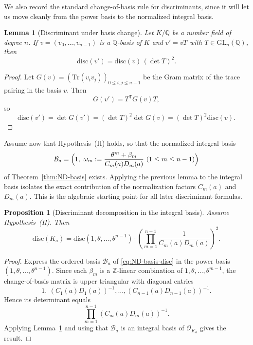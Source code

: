 \documentclass[11pt,letterpaper]{amsart}
\newcommand{\Q}{\mathbb{Q}}
\newcommand{\Z}{\mathbb{Z}}
\newcommand{\cO}{\mathcal{O}}
\newcommand{\GL}{\mathrm{GL}}
\newcommand{\Tr}{\mathrm{Tr}}
\newcommand{\disc}{\mathrm{disc}}
\theoremstyle{plain}
\newtheorem{proposition}[theorem]{Proposition}
\newtheorem{lemma}[theorem]{Lemma}
\theoremstyle{definition}
\begin{document}
We also record the standard change-of-basis rule for discriminants, since it will let us move cleanly from the power basis to the normalized integral basis.


\begin{lemma}[Discriminant under basis change]\label{lem:disc-basis-change}
Let $K/\Q$ be a number field of degree $n$.
If $v=(v_0,\dots,v_{n-1})$ is a $\Q$-basis of $K$ and $v'=vT$ with $T\in \GL_n(\Q)$, then
\[
\disc(v')=\disc(v)\,(\det T)^2.
\]
\end{lemma}

\begin{proof}
Let $G(v)=(\Tr(v_iv_j))_{0\le i,j\le n-1}$ be the Gram matrix of the trace pairing in the basis $v$.
Then
\[
G(v')=T^{\mathsf T}G(v)T,
\]
so
\[
\disc(v')=\det G(v')=(\det T)^2\det G(v)=(\det T)^2\disc(v).
\]
\end{proof}

Assume now that Hypothesis~\textup{(H)} holds, so that the normalized integral basis
\begin{equation}\label{eq:ND-basis-disc}
\mathcal B_a=
\Bigl(1,\ \omega_m:=\frac{\theta^m+\beta_m}{C_m(a)D_m(a)}\ (1\le m\le n-1)\Bigr)
\end{equation}
of Theorem~\ref{thm:ND-basis} exists. Applying the previous lemma to the integral basis isolates the exact contribution of the normalization factors \(C_m(a)\) and \(D_m(a)\). This is the algebraic starting point for all later discriminant formulas.

\begin{proposition}[Discriminant decomposition in the integral basis]
\label{prop:disc-ND-basis}
Assume Hypothesis~\textup{(H)}.
Then
\[
\disc(K_a)=\disc(1,\theta,\dots,\theta^{n-1})
\cdot
\left(\prod_{m=1}^{n-1}\frac{1}{C_m(a)D_m(a)}\right)^2.
\]
\end{proposition}

\begin{proof}
Express the ordered basis $\mathcal B_a$ of \eqref{eq:ND-basis-disc} in the power basis
$(1,\theta,\dots,\theta^{n-1})$.
Since each $\beta_m$ is a $\Z$-linear combination of $1,\theta,\dots,\theta^{m-1}$, the change-of-basis matrix
is upper triangular with diagonal entries
\[
1,\ (C_1(a)D_1(a))^{-1},\dots,(C_{n-1}(a)D_{n-1}(a))^{-1}.
\]
Hence its determinant equals
\[
\prod_{m=1}^{n-1}(C_m(a)D_m(a))^{-1}.
\]
Applying Lemma~\ref{lem:disc-basis-change} and using that $\mathcal B_a$ is an integral basis of $\cO_{K_a}$ gives
the result.
\end{proof}
\end{document}
